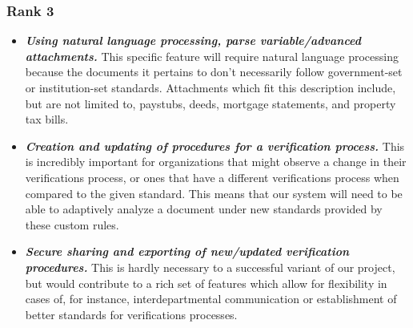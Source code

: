 \subsubsection{Rank 3}

\begin{itemize}[labelindent=0pt, wide]
    \item \textbf{\textit{Using natural language processing, parse variable/advanced attachments.}} This specific feature will require natural language processing because the documents it pertains to don't necessarily follow government-set or institution-set standards. Attachments which fit this description include, but are not limited to, paystubs, deeds, mortgage statements, and property tax bills.
    
    \item \textbf{\textit{Creation and updating of procedures for a verification process.}} This is incredibly important for organizations that might observe a change in their verifications process, or ones that have a different verifications process when compared to the given standard. This means that our system will need to be able to adaptively analyze a document under new standards provided by these custom rules.
    
    \item \textbf{\textit{Secure sharing and exporting of new/updated verification procedures.}} This is hardly necessary to a successful variant of our project, but would contribute to a rich set of features which allow for flexibility in cases of, for instance, interdepartmental communication or establishment of better standards for verifications processes.
\end{itemize}